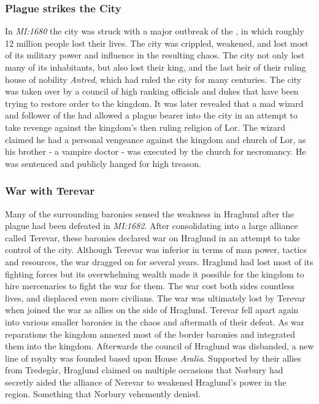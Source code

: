 \subsubsection{Plague strikes the City}
\label{sec:Plague of Hraglund}

In \emph{MI:1680} the city was struck with a major outbreak of
the , in which roughly 12 million people lost their
lives. The city was crippled, weakened, and lost most of its military power
and influence in the resulting chaos. The city not only lost many of its
inhabitants, but also lost their king, and the last heir of their ruling house
of nobility \emph{Antred}, which had ruled the city for many centuries. The
city was taken over by a council of high ranking officials and dukes that have
been trying to restore order to the kingdom. It was later revealed that a mad
wizard and follower of the  had allowed a plague bearer into
the city in an attempt to take revenge against the kingdom's then ruling
religion of Lor. The wizard claimed he had a personal vengeance against the
kingdom and church of Lor, as his brother - a vampire doctor - was executed by
the church for necromancy. He was sentenced and publicly hanged for high
treason.

\subsubsection{War with Terevar}
\label{sec:Terevar}

Many of the surrounding baronies sensed the weakness in Hraglund after the
plague had been defeated in \emph{MI:1682}. After consolidating into a large
alliance called Terevar, these baronies declared war on Hraglund in an attempt
to take control of the city. Although Terevar was inferior in terms of man
power, tactics and resources, the war dragged on for several years. Hraglund
had lost most of its fighting forces but its overwhelming wealth made it
possible for the kingdom to hire mercenaries to fight the war for them. The
war cost both sides countless lives, and displaced even more civilians. The
war was ultimately lost by Terevar when  joined the war
as allies on the side of Hraglund. Terevar fell apart again into various
smaller baronies in the chaos and aftermath of their defeat. As war
reparations the kingdom annexed most of the border baronies and integrated
them into the kingdom. Afterwards the council of Hraglund was disbanded, a new
line of royalty was founded based upon House \emph{Aralia}. Supported by their
allies from Tredegår, Hraglund claimed on multiple occasions that Norbury had
secretly aided the alliance of Nerevar to weakened Hraglund's power in the
region. Something that Norbury vehemently denied.


